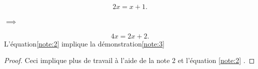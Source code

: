 \documentclass[12pt,a4paper]{article}
\begin{document}
\part{}
\begin{equation}\label{note:0}
    2x=x+1.
\end{equation}
\begin{center}\label{relation:0}
$\implies$
\end{center}
\begin{equation}\label{note:2}
    4x=2x+2.
\end{equation}
L'équation\eqref{note:2} implique la démonstration\ref{note:3}\\

\begin{proof}\label{note:3}
 Ceci implique plus de travail à l'aide de la note 2 et l'équation \eqref{note:2} .
\end{proof}
\end{document}
